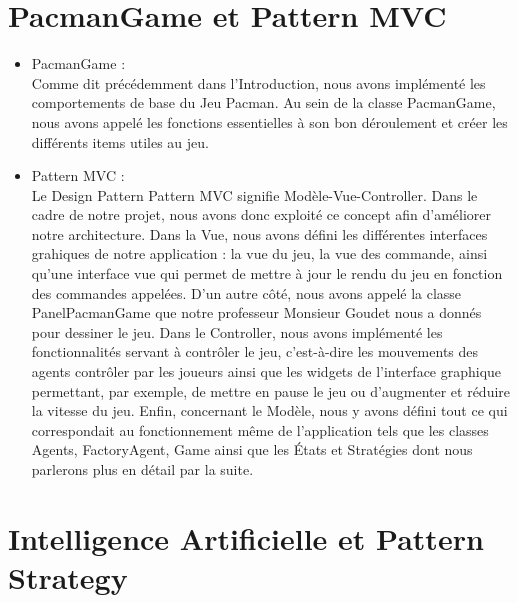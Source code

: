 \documentclass[a4paper, 11pt]{article}
\begin{document}
\part{PacmanGame et Pattern MVC}
\begin{itemize}
  \item PacmanGame : \\
  
Comme dit précédemment dans l'Introduction, nous avons implémenté les comportements de base du Jeu Pacman. Au sein de la classe PacmanGame, nous avons appelé
les fonctions essentielles à son bon déroulement et créer les différents items utiles au jeu. \\
 
  \item Pattern MVC : \\
  
Le Design Pattern Pattern MVC signifie Modèle-Vue-Controller. Dans le cadre de notre projet, nous avons donc exploité ce concept afin d'améliorer
notre architecture. Dans la Vue, nous avons défini les différentes interfaces grahiques de notre application : la vue du jeu, la vue des commande,
ainsi qu'une interface vue qui permet de mettre à jour le rendu du jeu en fonction des commandes appelées. D'un autre côté, nous avons appelé la
classe PanelPacmanGame que notre professeur Monsieur Goudet nous a donnés pour dessiner le jeu. Dans le Controller, nous avons implémenté les 
fonctionnalités servant à contrôler le jeu, c'est-à-dire les mouvements des agents contrôler par les joueurs ainsi que les widgets de l'interface
graphique permettant, par exemple, de mettre en pause le jeu ou d'augmenter et réduire la vitesse du jeu. Enfin, concernant le Modèle, nous y avons
défini tout ce qui correspondait au fonctionnement même de l'application tels que les classes Agents, FactoryAgent, Game ainsi que les États et Stratégies 
dont nous parlerons plus en détail par la suite. 

\end{itemize}

\part{Intelligence Artificielle et Pattern Strategy}
\end{document}
